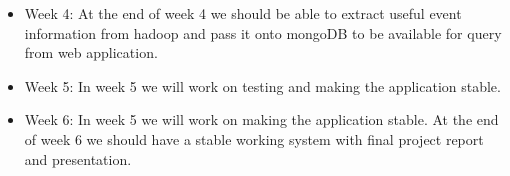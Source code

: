 \begin{itemize}
\begin{itemize}
	\item{ Week 4:}
	At the end of week 4 we should be able to extract useful event information from hadoop and pass it onto mongoDB to be available for query from web application.
	
	\item{ Week 5:}
	In week 5 we will work on testing and making the application stable.
	
	\item{ Week 6:}
	 In week 5 we will work on making the application stable. At the end of week 6 we should have a stable working system with final project report and presentation.
	\end{itemize}
\end{itemize}
